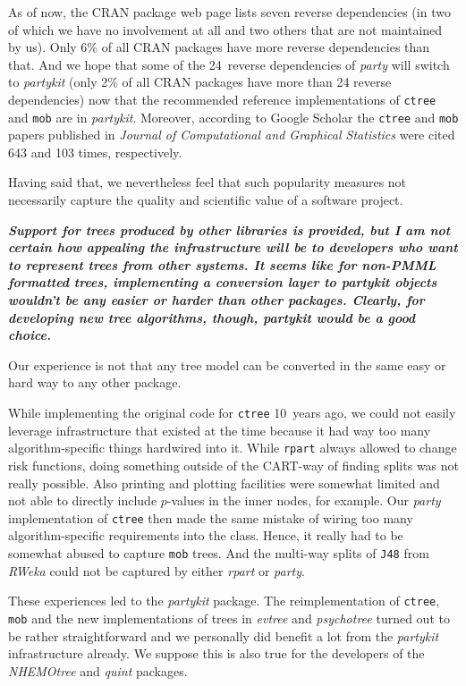 \documentclass{article}
\begin{document}
As of now, the CRAN package web page lists seven reverse dependencies (in two of
which we have no involvement at all and two others that are not maintained by us).
Only 6\% of all CRAN packages have more reverse dependencies than that. And we hope
that some of the 24~reverse dependencies of \emph{party} will switch to \emph{partykit}
(only 2\% of all CRAN packages have more than 24 reverse dependencies) now that the
recommended reference implementations of \texttt{ctree} and \texttt{mob} are in \emph{partykit}.
Moreover, according to Google Scholar the \texttt{ctree} and \texttt{mob} papers
published in \emph{Journal of Computational and Graphical Statistics} were cited
643 and 103 times, respectively.

Having said that, we nevertheless feel that such popularity measures not necessarily
capture the quality and scientific value of a software project.

\medskip

\textbf{\textit{%
Support for trees produced by other libraries is provided, but I am not
certain how appealing the infrastructure will be to developers who want to
represent trees from other systems.  It seems like for non-PMML formatted
trees, implementing a conversion layer to partykit objects wouldn't be any
easier or harder than other packages. Clearly, for developing new tree
algorithms, though, partykit would be a good choice.
}}

\smallskip

Our experience is not that any tree model can be converted in the same easy
or hard way to any other package.

While implementing the original code for \texttt{ctree} 10~years ago, we could
not easily leverage infrastructure that existed at the time because it had way too many
algorithm-specific things hardwired into it. While \texttt{rpart}
always allowed to change risk functions, doing something outside of the
CART-way of finding splits was not really possible. Also printing and plotting
facilities were somewhat limited and not able to directly include $p$-values
in the inner nodes, for example.
Our \emph{party} implementation of \texttt{ctree} then made the same mistake of
wiring too many algorithm-specific requirements into the class. Hence, it really
had to be somewhat abused to capture \texttt{mob} trees. And the multi-way splits of
\texttt{J48} from \emph{RWeka} could not be captured by either \emph{rpart}
or \emph{party}.

These experiences led to the \emph{partykit} package. The reimplementation of
\texttt{ctree}, \texttt{mob} and the new implementations of trees in \emph{evtree} and \emph{psychotree}
turned out to be rather straightforward and we personally did benefit a lot
from the \emph{partykit} infrastructure already. We suppose this is also true for
the developers of the \emph{NHEMOtree} and \emph{quint} packages.
\end{document}
